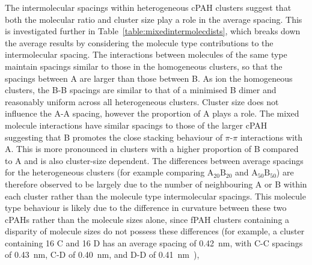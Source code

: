 The intermolecular spacings within heterogeneous cPAH clusters suggest that both the molecular ratio and cluster size play a role in the average spacing. This is investigated further in Table~\ref{table:mixedintermolecdists}, which breaks down the average results by considering the molecule type contributions to the intermolecular spacing. The interactions between molecules of the same type maintain spacings similar to those in the homogeneous clusters, so that the spacings between A are larger than those between B. As ion the homogeneous clusters, the B-B spacings are similar to that of a minimised B dimer and reasonably uniform across all heterogeneous clusters.  %
Cluster size does not influence the A-A spacing, however the proportion of A plays a role. The mixed molecule interactions have similar spacings to those of the larger cPAH suggesting that B promotes the close stacking behaviour of $\pi$-$\pi$ interactions with A. This is more pronounced in clusters with a higher proportion of B compared to A and is also cluster-size dependent. The differences between average spacings for the heterogeneous clusters (for example comparing $\text{A}_{\text{20}}\text{B}_{\text{20}}$ and $\text{A}_{\text{50}}\text{B}_{\text{50}}$) are therefore observed to be largely due to the number of neighbouring A or B within each cluster rather than the molecule type intermolecular spacings. %
This molecule type behaviour is likely due to the difference in curvature between these two cPAHs rather than the molecule sizes alone, since fPAH clusters containing a disparity of molecule sizes do not possess these differences (for example, a cluster containing 16 C and 16 D has an average spacing of 0.42~nm, with C-C spacings of 0.43~nm, C-D of 0.40~nm, and D-D of 0.41~nm~\cite{bowal2018partitioning}), 

